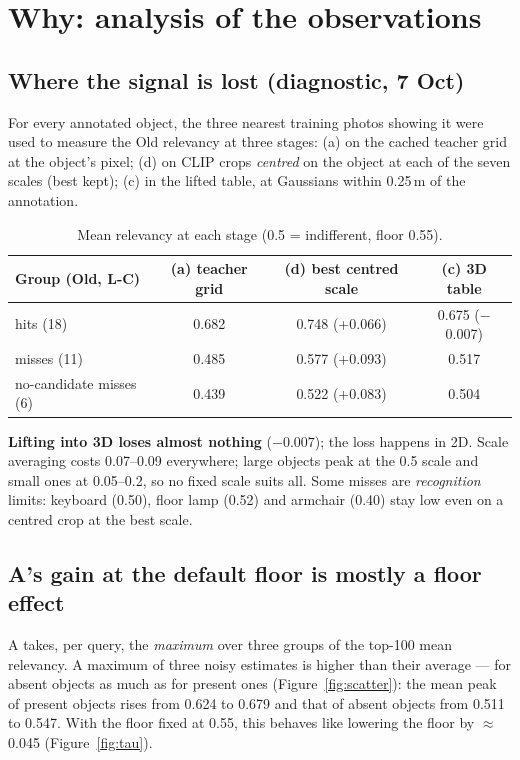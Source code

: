\documentclass[11pt,a4paper]{article}
\begin{document}
\section{Why: analysis of the observations}

\subsection{Where the signal is lost (diagnostic, 7 Oct)}
\label{sec:diag}
For every annotated object, the three nearest training photos showing it were used to measure the Old relevancy at
three stages: (a) on the cached teacher grid at the object's pixel; (d) on CLIP crops \emph{centred} on the object at
each of the seven scales (best kept); (c) in the lifted table, at Gaussians within 0.25\,m of the annotation.

\begin{table}[ht]
\centering\small
\begin{tabular}{@{}lccc@{}}
\toprule
Group (Old, L-C) & (a) teacher grid & (d) best centred scale & (c) 3D table \\
\midrule
hits (18)               & 0.682 & 0.748 (+0.066) & 0.675 ($-$0.007) \\
misses (11)             & 0.485 & 0.577 (+0.093) & 0.517 \\
no-candidate misses (6) & 0.439 & 0.522 (+0.083) & 0.504 \\
\bottomrule
\end{tabular}
\caption{Mean relevancy at each stage (0.5 = indifferent, floor 0.55).}
\end{table}

\textbf{Lifting into 3D loses almost nothing} ($-0.007$); the loss happens in 2D. Scale averaging costs 0.07--0.09
everywhere; large objects peak at the 0.5 scale and small ones at 0.05--0.2, so no fixed scale suits all. Some misses are
\emph{recognition} limits: keyboard (0.50), floor lamp (0.52) and armchair (0.40) stay low even on a centred crop at the
best scale.

\subsection{A's gain at the default floor is mostly a floor effect}
\label{sec:floor}
A takes, per query, the \emph{maximum} over three groups of the top-100 mean relevancy. A maximum of three noisy
estimates is higher than their average --- for absent objects as much as for present ones (Figure~\ref{fig:scatter}):
the mean peak of present objects rises from 0.624 to 0.679 and that of absent objects from 0.511 to 0.547. With the floor
fixed at 0.55, this behaves like lowering the floor by $\approx$0.045 (Figure~\ref{fig:tau}).
\end{document}
